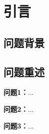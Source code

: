\section{引言}

\subsection{问题背景}

\subsection{问题重述}
\textbf{问题1：}...

\textbf{问题2：}...

\textbf{问题3：}...
